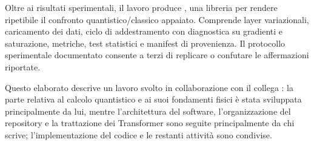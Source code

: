 Oltre ai risultati sperimentali, il lavoro produce
, una libreria per rendere ripetibile il confronto
quantistico/classico appaiato. Comprende layer variazionali, caricamento dei
dati, ciclo di addestramento con diagnostica su gradienti e saturazione,
metriche, test statistici e manifest di provenienza. Il protocollo sperimentale
documentato consente a terzi di replicare o confutare le affermazioni riportate.

Questo elaborato descrive un lavoro svolto in collaborazione con il collega
\Coautore{}: la parte relativa al calcolo quantistico e ai suoi fondamenti fisici
è stata sviluppata principalmente da lui, mentre l'architettura del software,
l'organizzazione del repository e la trattazione dei Transformer sono seguite
principalmente da chi scrive; l'implementazione del codice e le restanti attività
sono condivise.

\cleardoublepage
